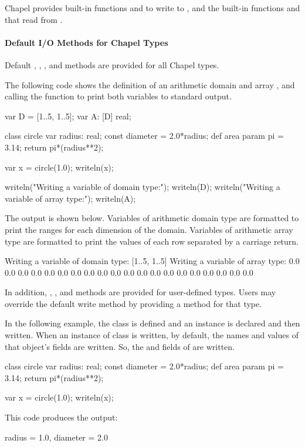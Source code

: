 Chapel provides built-in functions  and 
to write to , and the built-in functions 
and  that read from .

\paragraph{Default I/O Methods for Chapel Types}
Default , , , and  
methods are provided for all Chapel types.  

\begin{example}
The following code shows the definition of an arithmetic domain 
and array , and calling the  function
to print both variables to standard output.  
\begin{chapel}
var D = [1..5, 1..5];
var A: [D] real;

class circle {
  var radius: real;
  const diameter = 2.0*radius;
  def area {
    param pi = 3.14;
    return pi*(radius**2);
  }
}

var x = circle(1.0);
writeln(x);

writeln("Writing a variable of domain type:");
writeln(D);
writeln("Writing a variable of array type:");
writeln(A);
\end{chapel}

The output is shown below.  Variables of arithmetic domain type are 
formatted to print the ranges for each dimension of the domain.  Variables
of arithmetic array type are formatted to print the values of each row
separated by a carriage return.
\begin{commandline}
Writing a variable of domain type:
[1..5, 1..5]
Writing a variable of array type:
0.0 0.0 0.0 0.0 0.0
0.0 0.0 0.0 0.0 0.0
0.0 0.0 0.0 0.0 0.0
0.0 0.0 0.0 0.0 0.0
\end{commandline}
\end{example}

In addition, , ,  and 
 methods
are provided for user-defined types.  Users may override the default
write method by providing a  method
for that type.

\begin{example}
In the following example, the class  is defined and
an instance  is declared and then written.
When an instance of class is written, by default, the names and values 
of that object's fields are written.  So, the  and
 fields of  are written.

\begin{chapel}
class circle {
  var radius: real;
  const diameter = 2.0*radius;
  def area {
    param pi = 3.14;
    return pi*(radius**2);
  }
}

var x = circle(1.0);
writeln(x);
\end{chapel}

This code produces the output:
\begin{commandline}
{radius = 1.0, diameter = 2.0}
\end{commandline}
\end{example}

